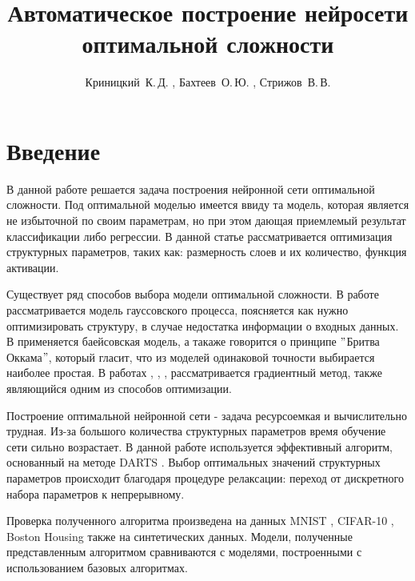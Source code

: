 \documentclass[12pt, twoside]{article}
\title
    {Автоматическое построение нейросети оптимальной сложности }
\author
    {Криницкий~К.\,Д. , Бахтеев~О.\,Ю. , Стрижов~В.\,В.}
\begin{document}
\maketitle

\section{Введение}
  В данной работе решается задача построения нейронной сети оптимальной сложности. Под оптимальной моделью имеется ввиду та модель, которая является не избыточной по своим параметрам, но при этом дающая приемлемый результат классификации либо регрессии. В данной статье рассматривается оптимизация структурных параметров, таких как: размерность слоев и их количество, функция активации.
  \par Существует ряд способов выбора модели оптимальной сложности. В работе \cite{GaussianModel} рассматривается модель гауссовского процесса, поясняется как нужно оптимизировать структуру, в случае недостатка информации о входных данных. В \cite{BayesianModel} применяется баейсовская модель, а такаже говорится о принципе $"$Бритва Оккама$"$, который гласит, что из моделей одинаковой точности выбирается наиболее простая. В работах \cite{Gradient1}, \cite{Gradient2}, \cite{Gradient3}, \cite{Gradient4} рассматривается градиентный метод, также являющийся одним из способов оптимизации. 
  \par Построение оптимальной нейронной сети - задача ресурсоемкая и вычислительно трудная. Из-за большого количества структурных параметров время обучение сети сильно возрастает. В данной работе используется эффективный алгоритм, основанный на методе DARTS \cite{DARTS}. Выбор оптимальных значений структурных параметров происходит благодаря процедуре релаксации: переход от дискретного набора параметров к непрерывному.
  \par Проверка полученного алгоритма произведена на данных MNIST \cite{MNIST}, CIFAR-10 \cite{CIFAR}, Boston Housing \cite{Boston} также на синтетических данных. Модели, полученные представленным алгоритмом сравниваются с моделями, построенными с использованием базовых алгоритмах.
\end{document}
